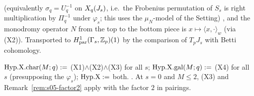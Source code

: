 \begin{hypothesis}
\begin{enumerate}[label=(X\arabic*)]
  (equivalently $\sigma_q=U_q^{-1}$ on $X_q(J_s)$, i.e.\ the Frobenius permutation of $S_s$ is right multiplication by $\Pi_q^{-1}$
  under $\varphi_s$; this uses the $\mu_N$-model of the Setting)
  , and the
  monodromy operator $N$ from the top to the bottom piece is $x\mapsto\langle x,\cdot\rangle_w$ (via (X2)). Transported to
  $H^1_{\rm par}(\Gamma_s,\mathbb{Z}_p)(1)$ by the comparison of $T_pJ_s$ with Betti cohomology.
\end{enumerate}
$\mathrm{Hyp.X.char}(M;q):=$ (X1)$\wedge$(X2)$\wedge$(X3) for all $s$; $\mathrm{Hyp.X.gal}(M;q):=$ (X4) for all $s$ (presupposing the $\varphi_s$);
$\mathrm{Hyp.X}:=$ both. \sthyp. At $s=0$ and $M\le2$, (X3) and Remark~\ref{rem:s05-factor2} apply with the factor $2$ in pairings.
\end{hypothesis}

